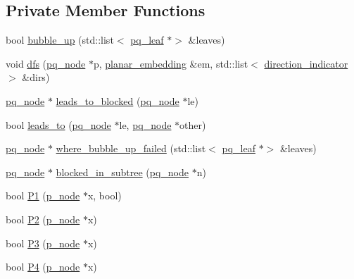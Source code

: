\subsection*{Private Member Functions}
\begin{DoxyCompactItemize}
\item 
bool \mbox{\hyperlink{classpq__tree_a109cb910dcb75d3e196a46f5174406c7}{bubble\+\_\+up}} (std\+::list$<$ \mbox{\hyperlink{classpq__leaf}{pq\+\_\+leaf}} $\ast$$>$ \&leaves)
\item 
void \mbox{\hyperlink{classpq__tree_a60d97d712c79b072693f75de3f0d328e}{dfs}} (\mbox{\hyperlink{classpq__node}{pq\+\_\+node}} $\ast$p, \mbox{\hyperlink{classplanar__embedding}{planar\+\_\+embedding}} \&em, std\+::list$<$ \mbox{\hyperlink{classdirection__indicator}{direction\+\_\+indicator}} $>$ \&dirs)
\item 
\mbox{\hyperlink{classpq__node}{pq\+\_\+node}} $\ast$ \mbox{\hyperlink{classpq__tree_adf4c0caf846fd0c5d793e4797ec46e3e}{leads\+\_\+to\+\_\+blocked}} (\mbox{\hyperlink{classpq__node}{pq\+\_\+node}} $\ast$le)
\item 
bool \mbox{\hyperlink{classpq__tree_aa2c33ce6225a761119a1ea00b91753db}{leads\+\_\+to}} (\mbox{\hyperlink{classpq__node}{pq\+\_\+node}} $\ast$le, \mbox{\hyperlink{classpq__node}{pq\+\_\+node}} $\ast$other)
\item 
\mbox{\hyperlink{classpq__node}{pq\+\_\+node}} $\ast$ \mbox{\hyperlink{classpq__tree_a5b394c87bfa938f388b847f0040c2940}{where\+\_\+bubble\+\_\+up\+\_\+failed}} (std\+::list$<$ \mbox{\hyperlink{classpq__leaf}{pq\+\_\+leaf}} $\ast$$>$ \&leaves)
\item 
\mbox{\hyperlink{classpq__node}{pq\+\_\+node}} $\ast$ \mbox{\hyperlink{classpq__tree_a6ce932de3106ad6c9d84bb2058784b0a}{blocked\+\_\+in\+\_\+subtree}} (\mbox{\hyperlink{classpq__node}{pq\+\_\+node}} $\ast$n)
\item 
bool \mbox{\hyperlink{classpq__tree_a3f3e775ad71be792aaf061d99d7d2af8}{P1}} (\mbox{\hyperlink{classp__node}{p\+\_\+node}} $\ast$x, bool)
\item 
bool \mbox{\hyperlink{classpq__tree_a38e09d7b7f7627dde9cb20a869e09e96}{P2}} (\mbox{\hyperlink{classp__node}{p\+\_\+node}} $\ast$x)
\item 
bool \mbox{\hyperlink{classpq__tree_a8afbdc0f1163021d5ca651c32a1da1d3}{P3}} (\mbox{\hyperlink{classp__node}{p\+\_\+node}} $\ast$x)
\item 
bool \mbox{\hyperlink{classpq__tree_aacac6fd2b8e973b98f961e91285540f0}{P4}} (\mbox{\hyperlink{classp__node}{p\+\_\+node}} $\ast$x)

\end{DoxyCompactItemize}
